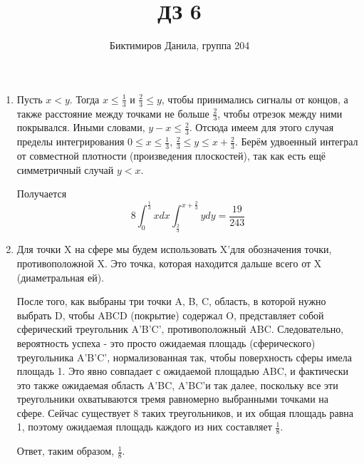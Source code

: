 \documentclass[11pt]{article}
\begin{document}
	
	\author{Биктимиров Данила, группа 204}
	\title{ДЗ 6}
	\date{}
	\maketitle
	
	\medskip
	
	\begin{enumerate}
		
		\item Пусть $x<y$. Тогда $x\le \frac13$ и $\frac23\le y$, чтобы принимались сигналы от концов, а также расстояние между точками не больше $\frac23$, чтобы отрезок между ними покрывался. Иными словами, $y−x\le\frac23$. Отсюда имеем для этого случая пределы интегрирования $0\le x\le\frac13$, $\frac23\le y\le x+\frac23$. Берём удвоенный интеграл от совместной плотности (произведения плоскостей), так как есть ещё симметричный случай $y<x$.
		
		Получается
		$$8\int_{0}^{\frac{1}{3}}xdx\int_{\frac{2}{3}}^{x+\frac{2}{3}}ydy=\frac{19}{243}$$
		
		\item Для точки X на сфере мы будем использовать X'для обозначения точки, противоположной X. Это точка, которая находится дальше всего от X (диаметральная ей).
		
		После того, как выбраны три точки A, B, C, область, в которой нужно выбрать D, чтобы ABCD (покрытие) содержал O, представляет собой сферический треугольник A’B’C’, противоположный ABC. Следовательно, вероятность успеха - это просто ожидаемая площадь (сферического) треугольника A'B'C', нормализованная так, чтобы поверхность сферы имела площадь 1. Это явно совпадает с ожидаемой площадью ABC, и фактически это также ожидаемая область A'BC, A'BC'и так далее, поскольку все эти треугольники охватываются тремя равномерно выбранными точками на сфере. Сейчас существует 8 таких треугольников, и их общая площадь равна 1, поэтому ожидаемая площадь каждого из них составляет $\frac18$.
		
		Ответ, таким образом, $\frac18$.
		
	\end{enumerate}
\end{document}
